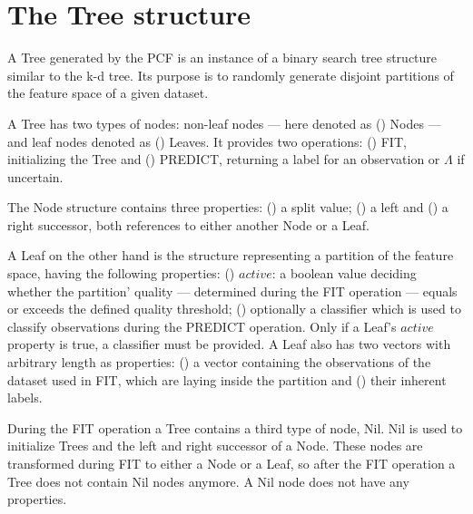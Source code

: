 \section{The Tree structure}
\label{sec:tree}

A Tree generated by the PCF is an instance of a binary
search tree structure similar to the k-d tree.
Its purpose is to randomly generate disjoint partitions of
the feature space of a given dataset.

A Tree has two types of nodes: non-leaf nodes --- here
denoted as () Nodes --- and leaf nodes
denoted as  () Leaves. It provides two
operations: () FIT, initializing the Tree
and () PREDICT, returning a label for an
observation or $\Lambda$ if uncertain.

The Node structure contains three properties:
() a split value; () a left
and () a right successor, both references to
either another Node or a Leaf.

A Leaf on the other hand is the structure representing a
partition of the feature space, having the following
properties: () $active$: a boolean value
deciding whether the partition' quality --- determined
during the FIT operation --- equals or exceeds the
defined quality threshold; () optionally a
classifier which is used to classify observations during
the PREDICT operation. Only if a Leaf's $active$ property
is true, a classifier must be provided. A Leaf also has two
vectors with arbitrary length as properties:
() a vector containing the observations of
the dataset used in FIT, which are laying inside the
partition and () their inherent labels.

During the FIT operation a Tree contains a third type of
node, Nil. Nil is used to initialize Trees
and the left and right successor of a Node. These nodes are
transformed during FIT to either a Node or a Leaf, so after
the FIT operation a Tree does not contain Nil nodes
anymore. A Nil node does not have any properties.




